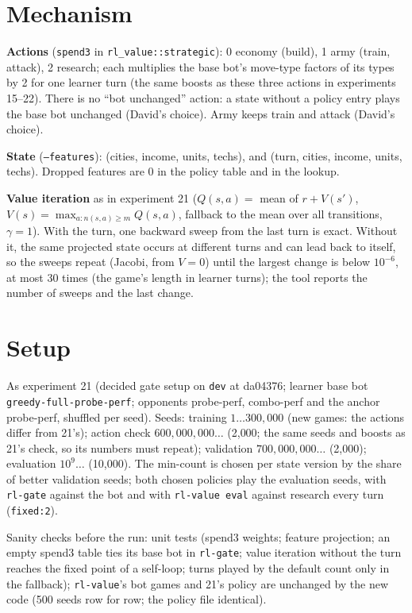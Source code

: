 \documentclass{../polyexp}
\begin{document}
\section{Mechanism}
\textbf{Actions} (\texttt{spend3} in \texttt{rl\_value::strategic}): 0 economy (build), 1 army (train, attack),
2 research; each multiplies the base bot's move-type factors of its types by 2 for one learner turn (the same
boosts as these three actions in experiments 15--22). There is no ``bot unchanged'' action: a state without a policy
entry plays the base bot unchanged (David's choice). Army keeps train and attack (David's choice).

\textbf{State} (\texttt{--features}): (cities, income, units, techs), and (turn, cities, income, units, techs).
Dropped features are 0 in the policy table and in the lookup.

\textbf{Value iteration} as in experiment 21 ($Q(s,a) = $ mean of $r + V(s')$, $V(s) = \max_{a: n(s,a) \ge m}
Q(s,a)$, fallback to the mean over all transitions, $\gamma = 1$). With the turn, one backward sweep from the last
turn is exact. Without it, the same projected state occurs at different turns and can lead back to itself, so the
sweeps repeat (Jacobi, from $V = 0$) until the largest change is below $10^{-6}$, at most 30 times (the game's length
in learner turns); the tool reports the number of sweeps and the last change.

\section{Setup}
As experiment 21 (decided gate setup on \texttt{dev} at da04376; learner base bot \texttt{greedy-full-probe-perf};
opponents probe-perf, combo-perf and the anchor probe-perf, shuffled per seed). Seeds: training $1\dots300{,}000$
(new games: the actions differ from 21's); action check $600{,}000{,}000\dots$ (2{,}000; the same seeds and boosts
as 21's check, so its numbers must repeat); validation $700{,}000{,}000\dots$ (2{,}000); evaluation $10^9\dots$
(10{,}000). The min-count is chosen per state version by the share of better validation seeds; both chosen policies
play the evaluation seeds, with \texttt{rl-gate} against the bot and with \texttt{rl-value eval} against research
every turn (\texttt{fixed:2}).

Sanity checks before the run: unit tests (spend3 weights; feature projection; an empty spend3 table ties its base bot
in \texttt{rl-gate}; value iteration without the turn reaches the fixed point of a self-loop; turns played by the
default count only in the fallback); \texttt{rl-value}'s bot games and 21's policy are unchanged by the new code
(500 seeds row for row; the policy file identical).
\end{document}
